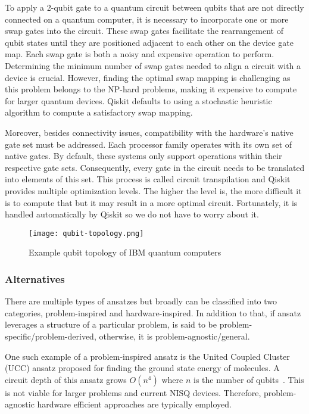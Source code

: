To apply a 2-qubit gate to a quantum circuit between qubits that are not directly connected on a quantum computer, it is necessary to incorporate one or more swap gates into the circuit. These swap gates facilitate the rearrangement of qubit states until they are positioned adjacent to each other on the device gate map. Each swap gate is both a noisy and expensive operation to perform. Determining the minimum number of swap gates needed to align a circuit with a device is crucial. However, finding the optimal swap mapping is challenging as this problem belongs to the NP-hard problems, making it expensive to compute for larger quantum devices. Qiskit defaults to using a stochastic heuristic algorithm to compute a satisfactory swap mapping.

Moreover, besides connectivity issues, compatibility with the hardware's native gate set must be addressed. Each processor family operates with its own set of native gates. By default, these systems only support operations within their respective gate sets. Consequently, every gate in the circuit needs to be translated into elements of this set. This process is called circuit transpilation and Qiskit provides multiple optimization levels. The higher the level is, the more difficult it is to compute that but it may result in a more optimal circuit. Fortunately, it is handled automatically by Qiskit so we do not have to worry about it. 

\begin{figure}[H]
    \texttt{[image: qubit-topology.png]}
    \caption{Example qubit topology of IBM quantum computers~\cite{img:topology}}
    \label{fig:qubit_topology}
\end{figure}

\subsubsection{Alternatives}
There are multiple types of ansatzes but broadly can be classified into two categories, problem-inspired and hardware-inspired. In addition to that, if ansatz leverages a structure of a particular problem, is said to be problem-specific/problem-derived, otherwise, it is problem-agnostic/general.

One such example of a problem-inspired ansatz is the United Coupled Cluster (UCC) ansatz proposed for finding the ground state energy of molecules. A circuit depth of this ansatz grows $O(n^4)$ where $n$ is the number of qubits~\cite{ucc_ansatz}. This is not viable for larger problems and current NISQ devices. Therefore, problem-agnostic hardware efficient approaches are typically employed.

